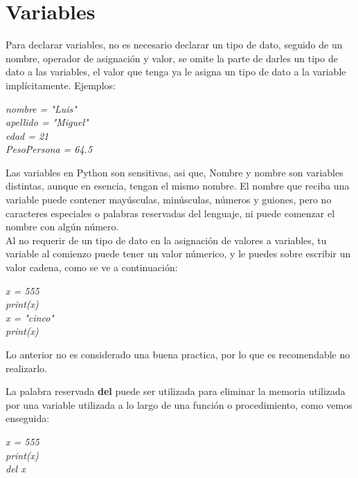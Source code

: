 \section{Variables}
\hspace{0.55cm}Para declarar variables, no es necesario declarar un tipo de dato, seguido de un nombre, operador de asignación y valor, se omite la parte de darles un tipo de dato a las variables, el valor que tenga ya le asigna un tipo de dato a la variable implícitamente. Ejemplos:
\begin{center}
	\textit{nombre = "Luis"\\apellido = "Miguel"\\edad = 21\\PesoPersona = 64.5}
\end{center}

Las variables en Python son sensitivas, asi que, Nombre y nombre son variables distintas, aunque en esencia, tengan el mismo nombre. El nombre que reciba una variable puede contener mayúsculas, minúsculas, números y guiones, pero no caracteres especiales o palabras reservadas del lenguaje, ni puede comenzar el nombre con algún número.\\

Al no requerir de un tipo de dato en la asignación de valores a variables, tu variable al comienzo puede tener un valor númerico, y le puedes sobre escribir un valor cadena, como se ve a continuación:
\begin{center}
	\textit{x = 555\\print(x)\\x = "cinco"\\print(x)}
\end{center}

Lo anterior no es considerado una buena practica, por lo que es recomendable no realizarlo.

La palabra reservada \textbf{del} puede ser utilizada para eliminar la memoria utilizada por una variable utilizada a lo largo de una función o procedimiento, como vemos enseguida:
\begin{center}
	\textit{x = 555\\print(x)\\del x}
\end{center}

